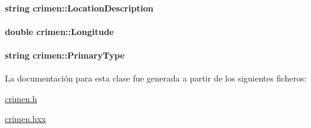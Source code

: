 \paragraph[{Location\+Description}]{\setlength{\rightskip}{0pt plus 5cm}string crimen\+::\+Location\+Description\hspace{0.3cm}{\ttfamily [private]}}\label{classcrimen_a221f7065c470883388174f19ea34d1f3}
\hypertarget{classcrimen_a9ffd3c64d12cc4b963b890b8db645964}{}
\paragraph[{Longitude}]{\setlength{\rightskip}{0pt plus 5cm}double crimen\+::\+Longitude\hspace{0.3cm}{\ttfamily [private]}}\label{classcrimen_a9ffd3c64d12cc4b963b890b8db645964}
\hypertarget{classcrimen_acc4a8a9f688d306a38519899a8c325a7}{}
\paragraph[{Primary\+Type}]{\setlength{\rightskip}{0pt plus 5cm}string crimen\+::\+Primary\+Type\hspace{0.3cm}{\ttfamily [private]}}\label{classcrimen_acc4a8a9f688d306a38519899a8c325a7}


La documentación para esta clase fue generada a partir de los siguientes ficheros\+:\begin{DoxyCompactItemize}
\item 
\hyperlink{crimen_8h}{crimen.\+h}\item 
\hyperlink{crimen_8hxx}{crimen.\+hxx}\end{DoxyCompactItemize}

